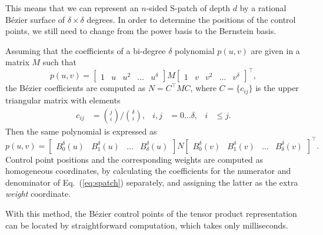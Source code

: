 \documentclass[9pt,academicons]{article}
\begin{document}
This means that we can represent an $n$-sided S-patch of depth $d$ by a rational B\'ezier
surface of $\delta\times\delta$ degrees. In order to determine the positions of the control points,
we still need to change from the power basis to the Bernstein basis.

Assuming that the coefficients of a bi-degree $\delta$ polynomial $p(u,v)$
are given in a matrix $M$ such that
\begin{equation}
  \label{eq:power}
  p(u,v)=
  \left[\begin{array}{ccccc}1&u&u^2&\dots&u^\delta\end{array}\right]
  M
  \left[\begin{array}{ccccc}1&v&v^2&\dots&v^\delta\end{array}\right]^\top,
\end{equation}
the B\'ezier coefficients are computed as $N=C^\top MC$, where $C=\{c_{ij}\}$ is
the upper triangular matrix with elements
\begin{equation}
  \begin{aligned}
    c_{ij}&={j\choose i}\bigg/{\delta\choose i}, & i,j&=0\dots\delta, & i&\leq j.
  \end{aligned}
\end{equation}
Then the same polynomial is expressed as
\begin{equation}
  \label{eq:bernstein}
  p(u,v)=
  \left[\begin{array}{cccc}B_0^\delta(u)&B_1^\delta(u)&\dots&B_\delta^\delta(u)\end{array}\right]
  N
  \left[\begin{array}{cccc}B_0^\delta(v)&B_1^\delta(v)&\dots&B_\delta^\delta(v)\end{array}\right]^\top.
\end{equation}
Control point positions and the corresponding weights are computed as homogeneous coordinates,
by calculating the coefficients for the numerator and denominator of Eq.~(\ref{eq:spatch})
separately, and assigning the latter as the extra \emph{weight} coordinate.

With this method, the B\'ezier control points of the tensor product representation
can be located by straightforward computation, which takes only milliseconds.
\end{document}
